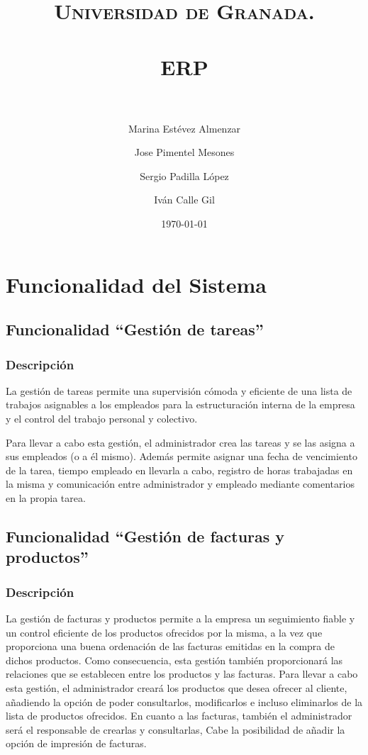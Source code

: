\documentclass[paper=a4, fontsize=11pt, spanish]{scrartcl}
\title{
	\normalfont \normalsize
	\textsc{Universidad de Granada.} \\ [25pt]
	\horrule{0.5pt} \\[0.4cm]
	\huge ERP \\
	\horrule{2pt} \\[0.5cm]
}
\author{Marina Estévez Almenzar\\
	\and
	Jose Pimentel Mesones\\
	\and
	Sergio Padilla López\\
	\and
	Iván Calle Gil\\}
\date{\normalsize\today}
\begin{document}
	\maketitle
	
	\section{Funcionalidad del Sistema}
	
	\subsection{Funcionalidad “Gestión de tareas”}
	
	\subsubsection{Descripción}
	\setlength{\parindent}{3em} La gestión de tareas permite una supervisión cómoda y eficiente de una lista de trabajos asignables a los empleados para la estructuración interna de la empresa y el control del trabajo personal y colectivo.
	
	Para llevar a cabo esta gestión, el administrador crea las tareas y se las asigna a sus empleados (o a él mismo). Además permite asignar una fecha de vencimiento de la tarea, tiempo empleado en llevarla a cabo, registro de horas trabajadas en la misma y comunicación entre administrador y empleado mediante comentarios en la propia tarea.
	
	\subsection{Funcionalidad “Gestión de facturas y productos”}
	
	\subsubsection{Descripción}
	\setlength{\parindent}{3em} La gestión de facturas y productos permite a la empresa un seguimiento fiable y un control eficiente de los productos ofrecidos por la misma, a la vez que proporciona una buena ordenación de las facturas emitidas en la compra de dichos productos. Como consecuencia, esta gestión también proporcionará las relaciones que se establecen entre los productos y las facturas.
	Para llevar a cabo esta gestión, el administrador creará los productos que desea ofrecer al cliente, añadiendo la opción de poder consultarlos, modificarlos e incluso eliminarlos de la lista de productos ofrecidos. En cuanto a las facturas, también el administrador será el responsable de crearlas y consultarlas, Cabe la posibilidad de añadir la opción de impresión de facturas.
	
\end{document}
